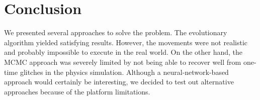 \section{Conclusion} \label{sec:conclusion}

We presented several approaches to solve the problem.
The evolutionary algorithm yielded satisfying results. However, the movements were not realistic and probably impossible to execute in the real world. On the other hand, the MCMC approach was severely limited by not being able to recover well from one-time glitches in the physics simulation.
Although a neural-network-based approach would certainly be interesting, we decided to test out alternative approaches because of the platform limitations.
